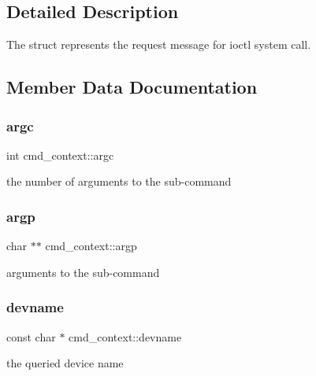 \subsection{Detailed Description}
The struct represents the request message for ioctl system call. 

\subsection{Member Data Documentation}
\mbox{\label{structcmd__context_a1aa1c9bed1f38cff4fd629b65a8cbca9}} 
\subsubsection{\texorpdfstring{argc}{argc}}
{\footnotesize\ttfamily int cmd\+\_\+context\+::argc}



the number of arguments to the sub-\/command 

\mbox{\label{structcmd__context_a24ef49bb73e5c7212d3277860adce333}} 
\subsubsection{\texorpdfstring{argp}{argp}}
{\footnotesize\ttfamily char $\ast$$\ast$ cmd\+\_\+context\+::argp}



arguments to the sub-\/command 

\mbox{\label{structcmd__context_ab8b7bd55de702a0928b0d27b7d7f46c4}} 
\subsubsection{\texorpdfstring{devname}{devname}}
{\footnotesize\ttfamily const char $\ast$ cmd\+\_\+context\+::devname}



the queried device name 

\mbox{\label{structcmd__context_a3482941a7d95d94958fd026e984aaad6}} 

